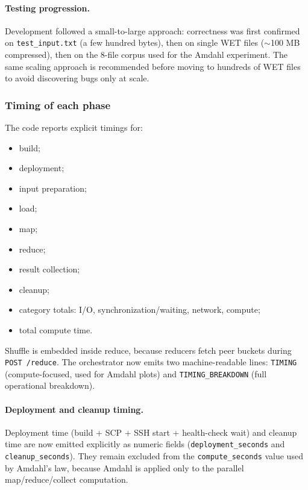 \documentclass[11pt,a4paper]{article}
\begin{document}
\paragraph{Testing progression.}
Development followed a small-to-large approach: correctness was first confirmed
on \texttt{test\_input.txt} (a few hundred bytes), then on single WET files
($\sim$100 MB compressed), then on the 8-file corpus used for the Amdahl
experiment. The same scaling approach is recommended before moving to hundreds
of WET files to avoid discovering bugs only at scale.

\subsubsection{Timing of each phase}

The code reports explicit timings for:
\begin{itemize}[leftmargin=1.5em]
  \item build;
  \item deployment;
  \item input preparation;
  \item load;
  \item map;
  \item reduce;
  \item result collection;
  \item cleanup;
  \item category totals: I/O, synchronization/waiting, network, compute;
  \item total compute time.
\end{itemize}

Shuffle is embedded inside reduce, because reducers fetch peer buckets during
\texttt{POST /reduce}. The orchestrator now emits two machine-readable lines:
\texttt{TIMING} (compute-focused, used for Amdahl plots) and
\texttt{TIMING\_BREAKDOWN} (full operational breakdown).

\paragraph{Deployment and cleanup timing.}
Deployment time (build $+$ SCP $+$ SSH start $+$ health-check wait) and
cleanup time are now emitted explicitly as numeric fields
(\texttt{deployment\_seconds} and \texttt{cleanup\_seconds}). They remain excluded
from the \texttt{compute\_seconds} value used by Amdahl's law, because Amdahl is
applied only to the parallel map/reduce/collect computation.
\end{document}
